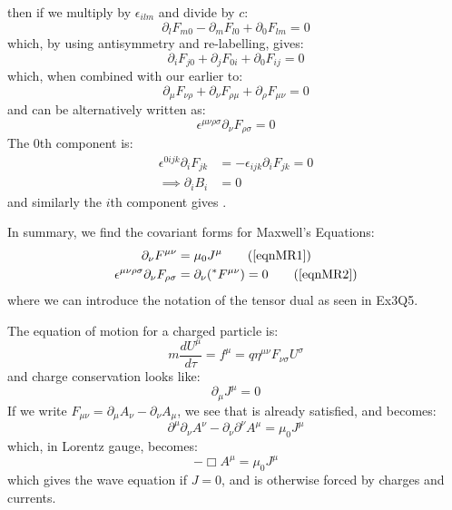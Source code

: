 \documentclass[../Main.tex]{subfiles}
\begin{document}
then if we multiply by $\epsilon_{ilm}$ and divide by $c$:
\begin{equation*}
    \partial_l F_{m0} - \partial_m F_{l0} + \partial_0 F_{lm} = 0
\end{equation*}
which, by using antisymmetry and re-labelling, gives:
\begin{equation*}
    \partial_i F_{j0} + \partial_j F_{0i} + \partial_0 F_{ij} = 0
\end{equation*}
which, when combined with our earlier  to:
\begin{equation}
    \partial_\mu F_{\nu \rho} + \partial_\nu F_{\rho \mu} + \partial_\rho F_{\mu \nu} = 0
    \label{eqnMR2Expanded}
\end{equation}
and can be alternatively written as:
\begin{equation}
    \epsilon^{\mu \nu \rho \sigma} \partial_\nu F_{\rho \sigma} = 0
    \label{eqnMR2}
\end{equation}
The $0$th component is:
\begin{align*}
    \epsilon^{0ijk} \partial_i F_{jk} &= -\epsilon_{ijk} \partial_i F_{jk} = 0 \\
    \implies \partial_iB_i &= 0
\end{align*}
and similarly the $i$th component gives .

In summary, we find the covariant forms for Maxwell's Equations:
\begin{align*}
    \partial_\nu F^{\mu \nu} &= \mu_0 J^\mu \tag{\ref{eqnMR1}} \\
    \epsilon^{\mu \nu \rho \sigma} \partial_\nu F_{\rho \sigma} &= \partial_\nu (\hphantom{}^*F^{\mu \nu}) = 0 \tag{\ref{eqnMR2}}
\end{align*}
where we can introduce the notation of the tensor dual as seen in Ex3Q5.

The equation of motion for a charged particle is:
\begin{equation*}
    m\frac{dU^\mu}{d\tau} = f^{\mu} = q\eta^{\mu \nu} F_{\nu \sigma} U^\sigma
\end{equation*}
and charge conservation looks like:
\begin{equation}
    \partial_\mu J^\mu = 0
    \label{eqnRChargeConserve}
\end{equation}
If we write $F_{\mu \nu} = \partial_\mu A_\nu - \partial_\nu A_\mu$, we see that  is already satisfied, and  becomes:
\begin{equation*}
    \partial^\mu \partial_\nu A^\nu - \partial_\nu\partial^\nu A^\mu = \mu_0 J^\mu
\end{equation*}
which, in Lorentz gauge, becomes:
\begin{equation}
    -\Box A^\mu = \mu_0 J^\mu
    \label{eqnRPotPoisson}
\end{equation}
which gives the wave equation if $J = 0$, and is otherwise forced by charges and currents.
\end{document}
